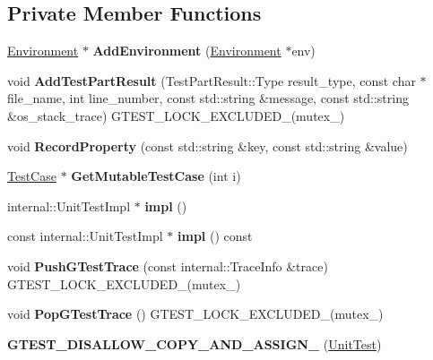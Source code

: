 \subsection*{Private Member Functions}
\begin{DoxyCompactItemize}
\item 
\mbox{\label{classtesting_1_1_unit_test_a3b64e1255cbd346e0ce40cd3e7a514f7}} 
\hyperlink{classtesting_1_1_environment}{Environment} $\ast$ {\bfseries Add\+Environment} (\hyperlink{classtesting_1_1_environment}{Environment} $\ast$env)
\item 
\mbox{\label{classtesting_1_1_unit_test_a1d157d2e9a5c1d3405333410c6b13932}} 
void {\bfseries Add\+Test\+Part\+Result} (Test\+Part\+Result\+::\+Type result\+\_\+type, const char $\ast$file\+\_\+name, int line\+\_\+number, const std\+::string \&message, const std\+::string \&os\+\_\+stack\+\_\+trace) G\+T\+E\+S\+T\+\_\+\+L\+O\+C\+K\+\_\+\+E\+X\+C\+L\+U\+D\+E\+D\+\_\+(mutex\+\_\+)
\item 
\mbox{\label{classtesting_1_1_unit_test_a2c96a4a02c34095e07c6999e7686367f}} 
void {\bfseries Record\+Property} (const std\+::string \&key, const std\+::string \&value)
\item 
\mbox{\label{classtesting_1_1_unit_test_a66e2a1c0017e9f5375c38d270d9b6754}} 
\hyperlink{classtesting_1_1_test_case}{Test\+Case} $\ast$ {\bfseries Get\+Mutable\+Test\+Case} (int i)
\item 
\mbox{\label{classtesting_1_1_unit_test_a4df5d11a58affb337d7fa62eaa07690e}} 
internal\+::\+Unit\+Test\+Impl $\ast$ {\bfseries impl} ()
\item 
\mbox{\label{classtesting_1_1_unit_test_a266a9f49070d1959c1c9d649423879b4}} 
const internal\+::\+Unit\+Test\+Impl $\ast$ {\bfseries impl} () const
\item 
\mbox{\label{classtesting_1_1_unit_test_af455b953108ff09b3b6e41011653e78a}} 
void {\bfseries Push\+G\+Test\+Trace} (const internal\+::\+Trace\+Info \&trace) G\+T\+E\+S\+T\+\_\+\+L\+O\+C\+K\+\_\+\+E\+X\+C\+L\+U\+D\+E\+D\+\_\+(mutex\+\_\+)
\item 
\mbox{\label{classtesting_1_1_unit_test_a70b3e3282778bc9a36520fe0a8be3c57}} 
void {\bfseries Pop\+G\+Test\+Trace} () G\+T\+E\+S\+T\+\_\+\+L\+O\+C\+K\+\_\+\+E\+X\+C\+L\+U\+D\+E\+D\+\_\+(mutex\+\_\+)
\item 
\mbox{\label{classtesting_1_1_unit_test_a1e04cfb4f837cea288a98f2a64c43bba}} 
{\bfseries G\+T\+E\+S\+T\+\_\+\+D\+I\+S\+A\+L\+L\+O\+W\+\_\+\+C\+O\+P\+Y\+\_\+\+A\+N\+D\+\_\+\+A\+S\+S\+I\+G\+N\+\_\+} (\hyperlink{classtesting_1_1_unit_test}{Unit\+Test})
\end{DoxyCompactItemize}
